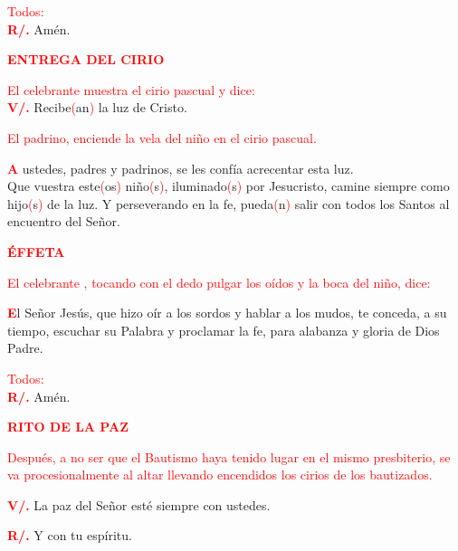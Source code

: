 \documentclass[12pt, letterpaper, spanish]{article}
\begin{document}
  \large {\textcolor{red}{Todos:}} \\
  \Large {\bfseries \textcolor{red}{R/.}} \hspace{0.5cm} Am\'en. 

  \Large {\bfseries \textcolor{red}{ENTREGA DEL CIRIO}} 

  \large {\textcolor{red}{El celebrante muestra el cirio pascual y dice:}} \\
  \Large {\bfseries \textcolor{red}{V/.}} \hspace{0.5cm} Recibe\textcolor{red}{(}an\textcolor{red}{)} la luz de Cristo. 

  \large {\textcolor{red}{El padrino, enciende la vela del ni\~no en el cirio pascual.}} 

  \lettrine[lines=2]{\bfseries \textcolor{red}{A}}{} \Large ustedes, padres y padrinos, se les conf\'ia acrecentar esta luz.\\
  Que vuestra este\textcolor{red}{(}os\textcolor{red}{)} ni\~no\textcolor{red}{(}s\textcolor{red}{)}, iluminado\textcolor{red}{(}s\textcolor{red}{)} por Jesucristo, camine siempre como hijo\textcolor{red}{(}s\textcolor{red}{)} de la luz. Y perseverando en la fe, pueda\textcolor{red}{(}n\textcolor{red}{)} salir con todos los Santos al encuentro del Se\~nor. 

  \Large {\bfseries \textcolor{red}{ \'EFFETA}} 

  \large {\textcolor{red}{El celebrante , tocando con el dedo pulgar los o\'idos y la boca del ni\~no, dice:}}
  
  \lettrine[lines=2]{\bfseries \textcolor{red}{E}}{}\Large l Se\~nor Jes\'us, que hizo o\'ir a los sordos y hablar a los mudos, te conceda, a su tiempo, escuchar su Palabra y proclamar la fe, para alabanza y gloria de Dios Padre.

  \large {\textcolor{red}{Todos:}}\\
  \Large {\bfseries \textcolor{red}{R/.}} \hspace{0.5cm} Am\'en.

  \Large {\bfseries \textcolor{red}{RITO DE LA PAZ}}

  \large {\textcolor{red}{Despu\'es, a no ser que el Bautismo haya tenido lugar en el mismo presbiterio, se va procesionalmente al altar llevando encendidos los cirios de los bautizados.}}

  \Large {\bfseries \textcolor{red}{V/.}} \hspace{0.5cm} La paz del Se\~nor est\'e siempre con ustedes.

  \Large {\bfseries \textcolor{red}{R/.}} \hspace{0.5cm} Y con tu esp\'iritu. 
\end{document}
